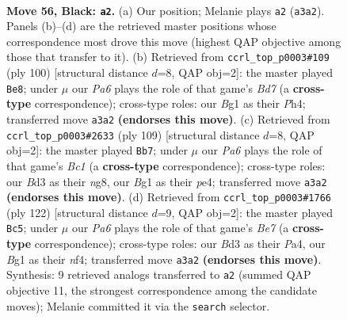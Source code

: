 \documentclass[11pt]{article}
\begin{document}
\clearpage

\begin{figure}[p]\centering
\begin{subfigure}{0.46\textwidth}\centering
\resizebox{\linewidth}{!}{%
\newchessgame
\chessboard[
  setfen={7K/8/6p1/6k1/8/p2b4/8/6b1 b - - 1 56},
  showmover=false,
  pgfstyle=straightmove, color=movearrow, markmove={a3-a2}
]}
\caption{}
\end{subfigure}\hfill
\begin{subfigure}{0.46\textwidth}\centering
\resizebox{\linewidth}{!}{%
\newchessgame
\chessboard[
  setfen={8/3B4/5k2/8/7P/5K2/5P1b/8 w - - 13 51},
  showmover=false,
  pgfstyle=straightmove, color=movearrow, markmove={d7-e8}
]}
\caption{}
\end{subfigure}
\\[4pt]
\begin{subfigure}{0.46\textwidth}\centering
\resizebox{\linewidth}{!}{%
\newchessgame
\chessboard[
  setfen={2b3N1/8/8/7p/4P2k/8/5K2/8 b - - 7 55},
  showmover=false,
  pgfstyle=straightmove, color=movearrow, markmove={c8-b7}
]}
\caption{}
\end{subfigure}\hfill
\begin{subfigure}{0.46\textwidth}\centering
\resizebox{\linewidth}{!}{%
\newchessgame
\chessboard[
  setfen={8/4B3/2k5/8/P1K2n2/2P5/8/8 w - - 5 62},
  showmover=false,
  pgfstyle=straightmove, color=movearrow, markmove={e7-c5}
]}
\caption{}
\end{subfigure}
\caption{\textbf{Move 56, Black: \texttt{a2}.} (a) Our position; Melanie plays \texttt{a2} (\texttt{a3a2}). Panels (b)--(d) are the retrieved master positions whose correspondence most drove this move (highest QAP objective among those that transfer to it). (b) Retrieved from \texttt{ccrl\_top\_p0003\#109} (ply 100) [structural distance $d$=8, QAP obj=2]: the master played \texttt{Be8}; under $\mu$ our \emph{Pa6} plays the role of that game's \emph{Bd7} (a \textbf{cross-type} correspondence); cross-type roles: our \emph{B}g1 as their \emph{P}h4; transferred move \texttt{a3a2} \textbf{(endorses this move)}. (c) Retrieved from \texttt{ccrl\_top\_p0003\#2633} (ply 109) [structural distance $d$=8, QAP obj=2]: the master played \texttt{Bb7}; under $\mu$ our \emph{Pa6} plays the role of that game's \emph{Bc1} (a \textbf{cross-type} correspondence); cross-type roles: our \emph{B}d3 as their \emph{n}g8, our \emph{B}g1 as their \emph{p}e4; transferred move \texttt{a3a2} \textbf{(endorses this move)}. (d) Retrieved from \texttt{ccrl\_top\_p0003\#1766} (ply 122) [structural distance $d$=9, QAP obj=2]: the master played \texttt{Bc5}; under $\mu$ our \emph{Pa6} plays the role of that game's \emph{Be7} (a \textbf{cross-type} correspondence); cross-type roles: our \emph{B}d3 as their \emph{P}a4, our \emph{B}g1 as their \emph{n}f4; transferred move \texttt{a3a2} \textbf{(endorses this move)}. Synthesis: 9 retrieved analogs transferred to \texttt{a2} (summed QAP objective 11, the strongest correspondence among the candidate moves); Melanie committed it via the \texttt{search} selector.}
\label{fig:thought-m111}
\end{figure}
\end{document}
